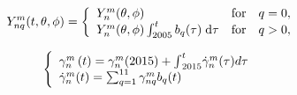 \documentclass[3p,authoryear,preprint,12pt]{elsarticle}
\begin{document}
\begin{equation} 
	\label{eq:3}
	Y_{nq}^m(t,\theta ,\phi )= \left\lbrace{
		\begin{array}{l@{\quad}l@{\quad}l}
			Y_n^m(\theta ,\phi ) & {\rm for} & q=0, \\ 
			Y_n^m(\theta ,\phi ) \int _{2005}^t b_q(\tau )\;{\rm d}\tau & {\rm for} & q>0, 
		\end{array}
	}\right. 
\end{equation} 


\begin{equation} 
	\label{eq:4}
	\left\lbrace{
		\begin{array}{l@{\quad}l@{\quad}l}
			{\gamma}_{n}^{m}\left(t\right)={\gamma}_{n}^m(2015)+{\int }_{2015}^{t}\dot{\gamma}_n^m(\tau)d\tau \\
			\dot{\gamma}_n^m(t)=\sum_{q=1}^{11}\gamma_{nq}^mb_q(t)
		\end{array}
	}\right. 
\end{equation}
\fi
\end{document}
